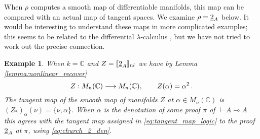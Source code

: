 \documentclass[english,letter paper,12pt,reqno]{article}
\theoremstyle{example}
\newtheorem{example}[theorem]{Example}
\numberwithin{equation}{section}
\begin{document}
When $\rho$ computes a smooth map of differentiable manifolds, this map can be compared with an actual map of tangent spaces. We examine $\rho = \underline{2}_A$ below. It would be interesting to understand these maps in more complicated examples; this seems to be related to the differential $\lambda$-calculus \cite{ehrhard_difflambda,ehrhard_difflambda2}, but we have not tried to work out the precise connection.

\begin{example}\label{example:tangent_to_2} When $k = \mathbb{C}$ and $Z = \llbracket \underline{2}_A \rrbracket_{nl}$ we have by Lemma \ref{lemma:nonlinear_recover}
\[
Z: M_n(\mathbb{C}) \longrightarrow M_n(\mathbb{C}), \qquad Z(\alpha) = \alpha^2\,.
\]
The tangent map of the smooth map of manifolds $Z$ at $\alpha \in M_n(\mathbb{C})$ is $(Z_*)_\alpha( \nu ) = \{ \nu, \alpha \}$. When $\alpha$ is the denotation of some proof $\pi$ of $\vdash A \multimap A$ this agrees with the tangent map assigned in \eqref{eq:tangent_map_logic} to the proof $\underline{2}_A$ at $\pi$, using \eqref{eq:church_2_den}.
\end{example}
\end{document}
